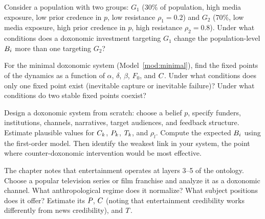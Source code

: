 \begin{exercise}
Consider a population with two groups: $G_1$ (30\% of population, high media exposure, low prior credence in $p$, low resistance $\rho_1 = 0.2$) and $G_2$ (70\%, low media exposure, high prior credence in $p$, high resistance $\rho_2 = 0.8$).
Under what conditions does a doxonomic investment targeting $G_1$ change the population-level $B_{i}$ more than one targeting $G_2$?
\end{exercise}

\begin{exercise}
For the minimal doxonomic system (Model~\ref{mod:minimal}), find the fixed points of the dynamics as a function of $\alpha$, $\delta$, $\beta$, $F_0$, and $C_{}$.
Under what conditions does only one fixed point exist (inevitable capture or inevitable failure)?
Under what conditions do two stable fixed points coexist?
\end{exercise}

\begin{exercise}
Design a doxonomic system from scratch: choose a belief $p$, specify funders, institutions, channels, narratives, target audiences, and feedback structure.
Estimate plausible values for $C_{k}$, $P_{k}$, $T_{k}$, and $\rho_l$.
Compute the expected $B_{i}$ using the first-order model.
Then identify the weakest link in your system, the point where counter-doxonomic intervention would be most effective.
\end{exercise}

\begin{exercise}
The chapter notes that entertainment operates at layers 3--5 of the ontology.
Choose a popular television series or film franchise and analyze it as a doxonomic channel.
What anthropological regime does it normalize?
What subject positions does it offer?
Estimate its $P_{}$, $C_{}$ (noting that entertainment credibility works differently from news credibility), and $T_{}$.
\end{exercise}
